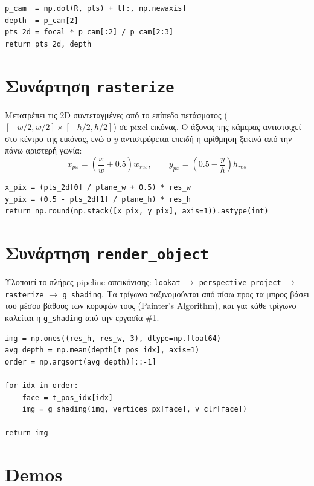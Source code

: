 \documentclass{article}
\begin{document}
\begin{lstlisting}
p_cam  = np.dot(R, pts) + t[:, np.newaxis]
depth  = p_cam[2]
pts_2d = focal * p_cam[:2] / p_cam[2:3]
return pts_2d, depth
\end{lstlisting}

\section{Συνάρτηση \texttt{rasterize}}

Μετατρέπει τις 2D συντεταγμένες από το επίπεδο πετάσματος
($[-w/2, w/2]\times[-h/2, h/2]$) σε pixel εικόνας. Ο άξονας της κάμερας
αντιστοιχεί στο κέντρο της εικόνας, ενώ ο $y$ αντιστρέφεται επειδή η
αρίθμηση ξεκινά από την πάνω αριστερή γωνία:
\[
x_{px} = \left(\frac{x}{w} + 0.5\right)w_{res}, \qquad
y_{px} = \left(0.5 - \frac{y}{h}\right)h_{res}
\]

\begin{lstlisting}
x_pix = (pts_2d[0] / plane_w + 0.5) * res_w
y_pix = (0.5 - pts_2d[1] / plane_h) * res_h
return np.round(np.stack([x_pix, y_pix], axis=1)).astype(int)
\end{lstlisting}

\section{Συνάρτηση \texttt{render\_object}}

Υλοποιεί το πλήρες pipeline απεικόνισης: \texttt{lookat} $\to$
\texttt{perspective\_project} $\to$ \texttt{rasterize} $\to$ \texttt{g\_shading}.
Τα τρίγωνα ταξινομούνται από πίσω προς τα μπρος βάσει του μέσου βάθους
των κορυφών τους (Painter's Algorithm), και για κάθε τρίγωνο καλείται η
\texttt{g\_shading} από την εργασία \#1.

\begin{lstlisting}
img = np.ones((res_h, res_w, 3), dtype=np.float64)
avg_depth = np.mean(depth[t_pos_idx], axis=1)
order = np.argsort(avg_depth)[::-1]

for idx in order:
    face = t_pos_idx[idx]
    img = g_shading(img, vertices_px[face], v_clr[face])

return img
\end{lstlisting}

\section{Demos}
\end{document}
